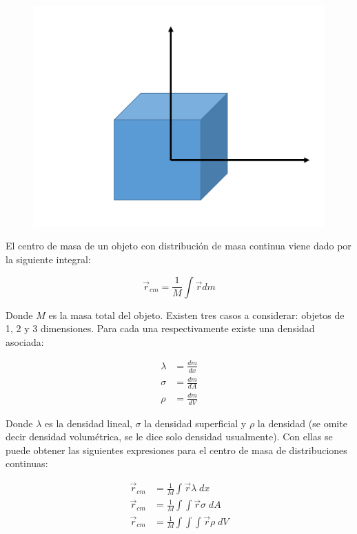 \documentclass[a4paper,11pt]{article}
\begin{document}
\begin{figure}
	\includegraphics[scale=0.5]{./im/3d}
\end{figure}


El centro de masa de un objeto con distribución de masa continua viene dado por la siguiente integral:

\begin{equation}
 \vec{r}_{cm} = \frac{1}{M} \int \vec{r} dm
\end{equation}

Donde $M$ es la masa total del objeto. Existen tres casos a considerar: objetos de 1, 2 y 3 dimensiones. Para cada una respectivamente existe una densidad asociada:

\begin{subequations}
	\begin{align}
	\lambda &= \frac{d m}{dx} \\
	\sigma &= \frac{d m}{dA} \\
	\rho &= \frac{d m}{dV} 
	\end{align}
\end{subequations}

Donde $\lambda$ es la densidad lineal, $\sigma$ la densidad superficial y $\rho$ la densidad (se omite decir densidad volumétrica, se le dice solo densidad usualmente). Con ellas se puede obtener las siguientes expresiones para el centro de masa de distribuciones continuas:

\begin{subequations}
	\begin{align}
	\vec{r}_{cm} &= \frac{1}{M} \int \vec{r} \lambda \;dx  \\
	\vec{r}_{cm} &= \frac{1}{M} \int \int \vec{r} \sigma \;dA \\
	\vec{r}_{cm} &= \frac{1}{M} \int \int \int \vec{r} \rho\; dV 
	\end{align}
\end{subequations}
\end{document}
